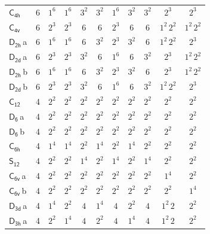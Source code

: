 \documentclass[10pt,a4paper]{article}
\numberwithin{equation}{section}
\newcommand{\grp}[1]{\mathsf{#1}}
\newcommand{\clsletter}[1]{\,{\scriptsize\color{black!55}#1}}
\begin{document}
{\begin{longtable}{@{}lrccccccccc@{}}
\href{C4h.pdf}{$\grp{C_{4h}}$} & 6 & $1^{6}$ & $1^{6}$ & $3^{2}$ & $3^{2}$ & $1^{6}$ & $3^{2}$ & $3^{2}$ & $2^{3}$ & $2^{3}$\\
\href{C4v.pdf}{$\grp{C_{4v}}$} & 6 & $2^{3}$ & $2^{3}$ & $6$ & $6$ & $2^{3}$ & $6$ & $6$ & $1^{2}\,2^{2}$ & $1^{2}\,2^{2}$\\
\href{D2h.pdf}{$\grp{D_{2h}}$}\clsletter{a} & 6 & $1^{6}$ & $1^{6}$ & $6$ & $3^{2}$ & $2^{3}$ & $3^{2}$ & $6$ & $1^{2}\,2^{2}$ & $2^{3}$\\
\href{D2d.pdf}{$\grp{D_{2d}}$}\clsletter{a} & 6 & $2^{3}$ & $2^{3}$ & $3^{2}$ & $6$ & $1^{6}$ & $6$ & $3^{2}$ & $2^{3}$ & $1^{2}\,2^{2}$\\
\href{D2h.pdf}{$\grp{D_{2h}}$}\clsletter{b} & 6 & $1^{6}$ & $1^{6}$ & $6$ & $3^{2}$ & $2^{3}$ & $3^{2}$ & $6$ & $2^{3}$ & $1^{2}\,2^{2}$\\
\href{D2d.pdf}{$\grp{D_{2d}}$}\clsletter{b} & 6 & $2^{3}$ & $2^{3}$ & $3^{2}$ & $6$ & $1^{6}$ & $6$ & $3^{2}$ & $1^{2}\,2^{2}$ & $2^{3}$\\
\href{C12.pdf}{$\grp{C_{12}}$} & 4 & $2^{2}$ & $2^{2}$ & $2^{2}$ & $2^{2}$ & $2^{2}$ & $2^{2}$ & $2^{2}$ & $2^{2}$ & $2^{2}$\\
\href{D6.pdf}{$\grp{D_{6}}$}\clsletter{a} & 4 & $2^{2}$ & $2^{2}$ & $2^{2}$ & $2^{2}$ & $2^{2}$ & $2^{2}$ & $2^{2}$ & $2^{2}$ & $2^{2}$\\
\href{D6.pdf}{$\grp{D_{6}}$}\clsletter{b} & 4 & $2^{2}$ & $2^{2}$ & $2^{2}$ & $2^{2}$ & $2^{2}$ & $2^{2}$ & $2^{2}$ & $2^{2}$ & $2^{2}$\\
\href{C6h.pdf}{$\grp{C_{6h}}$} & 4 & $1^{4}$ & $1^{4}$ & $2^{2}$ & $1^{4}$ & $2^{2}$ & $1^{4}$ & $2^{2}$ & $2^{2}$ & $2^{2}$\\
\href{S12.pdf}{$\grp{S_{12}}$} & 4 & $2^{2}$ & $2^{2}$ & $1^{4}$ & $2^{2}$ & $1^{4}$ & $2^{2}$ & $1^{4}$ & $2^{2}$ & $2^{2}$\\
\href{C6v.pdf}{$\grp{C_{6v}}$}\clsletter{a} & 4 & $2^{2}$ & $2^{2}$ & $2^{2}$ & $2^{2}$ & $2^{2}$ & $2^{2}$ & $2^{2}$ & $1^{4}$ & $2^{2}$\\
\href{C6v.pdf}{$\grp{C_{6v}}$}\clsletter{b} & 4 & $2^{2}$ & $2^{2}$ & $2^{2}$ & $2^{2}$ & $2^{2}$ & $2^{2}$ & $2^{2}$ & $2^{2}$ & $1^{4}$\\
\href{D3d.pdf}{$\grp{D_{3d}}$}\clsletter{a} & 4 & $1^{4}$ & $2^{2}$ & $4$ & $1^{4}$ & $4$ & $2^{2}$ & $4$ & $1^{2}\,2$ & $2^{2}$\\
\href{D3h.pdf}{$\grp{D_{3h}}$}\clsletter{a} & 4 & $2^{2}$ & $1^{4}$ & $4$ & $2^{2}$ & $4$ & $1^{4}$ & $4$ & $1^{2}\,2$ & $2^{2}$\\

\end{longtable}}
\end{document}

